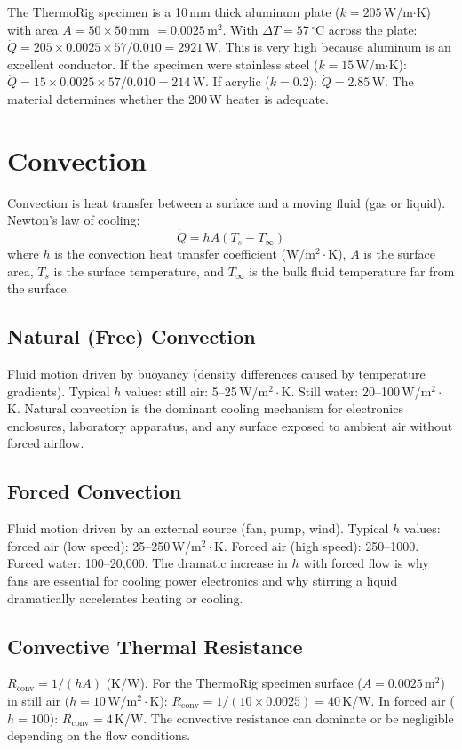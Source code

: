 \documentclass[11pt,letterpaper,twoside,openany]{book}
\newcommand{\degC}{\ensuremath{{}^{\circ}\text{C}}}
\begin{document}
\begin{examplebox}
The ThermoRig specimen is a 10\,mm thick aluminum plate ($k = 205$\,W/m$\cdot$K) with area $A = 50 \times 50$\,mm $= 0.0025$\,m$^2$. With $\Delta T = 57$\,\degC{} across the plate: $\dot{Q} = 205 \times 0.0025 \times 57 / 0.010 = 2921$\,W. This is very high because aluminum is an excellent conductor. If the specimen were stainless steel ($k = 15$\,W/m$\cdot$K): $\dot{Q} = 15 \times 0.0025 \times 57 / 0.010 = 214$\,W. If acrylic ($k = 0.2$): $\dot{Q} = 2.85$\,W. The material determines whether the 200\,W heater is adequate.
\end{examplebox}

\section{Convection}
Convection is heat transfer between a surface and a moving fluid (gas or liquid). Newton's law of cooling:
\begin{equation}
\dot{Q} = hA(T_s - T_\infty)
\end{equation}
where $h$ is the convection heat transfer coefficient (W/m$^2\cdot$K), $A$ is the surface area, $T_s$ is the surface temperature, and $T_\infty$ is the bulk fluid temperature far from the surface.

\subsection{Natural (Free) Convection}
Fluid motion driven by buoyancy (density differences caused by temperature gradients). Typical $h$ values: still air: 5--25\,W/m$^2\cdot$K. Still water: 20--100\,W/m$^2\cdot$K. Natural convection is the dominant cooling mechanism for electronics enclosures, laboratory apparatus, and any surface exposed to ambient air without forced airflow.

\subsection{Forced Convection}
Fluid motion driven by an external source (fan, pump, wind). Typical $h$ values: forced air (low speed): 25--250\,W/m$^2\cdot$K. Forced air (high speed): 250--1000. Forced water: 100--20{,}000. The dramatic increase in $h$ with forced flow is why fans are essential for cooling power electronics and why stirring a liquid dramatically accelerates heating or cooling.

\subsection{Convective Thermal Resistance}
$R_{\text{conv}} = 1/(hA)$ (K/W). For the ThermoRig specimen surface ($A = 0.0025$\,m$^2$) in still air ($h = 10$\,W/m$^2\cdot$K): $R_{\text{conv}} = 1/(10 \times 0.0025) = 40$\,K/W. In forced air ($h = 100$): $R_{\text{conv}} = 4$\,K/W. The convective resistance can dominate or be negligible depending on the flow conditions.
\end{document}
